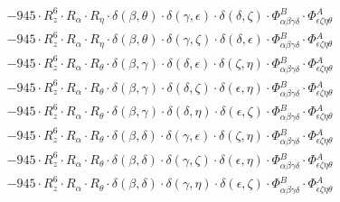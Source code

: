 \documentclass{article}
\begin{document}
\begin{equation}
\begin{array}{c}
 \\[0.2em] 		 - 945 \cdot R_{z}^{6} \cdot R_{\alpha{}} \cdot R_{\eta{}} \cdot \delta{}\left(\beta{}, \theta{}\right) \cdot \delta{}\left(\gamma{}, \epsilon{}\right) \cdot \delta{}\left(\delta{}, \zeta{}\right) \cdot \Phi{}^{B}_{\alpha{}\beta{}\gamma{}\delta{}} \cdot \Phi{}^{A}_{\epsilon{}\zeta{}\eta{}\theta{}} 
 \\[0.2em] 		 - 945 \cdot R_{z}^{6} \cdot R_{\alpha{}} \cdot R_{\eta{}} \cdot \delta{}\left(\beta{}, \theta{}\right) \cdot \delta{}\left(\gamma{}, \zeta{}\right) \cdot \delta{}\left(\delta{}, \epsilon{}\right) \cdot \Phi{}^{B}_{\alpha{}\beta{}\gamma{}\delta{}} \cdot \Phi{}^{A}_{\epsilon{}\zeta{}\eta{}\theta{}} 
 \\[0.2em] 		 - 945 \cdot R_{z}^{6} \cdot R_{\alpha{}} \cdot R_{\theta{}} \cdot \delta{}\left(\beta{}, \gamma{}\right) \cdot \delta{}\left(\delta{}, \epsilon{}\right) \cdot \delta{}\left(\zeta{}, \eta{}\right) \cdot \Phi{}^{B}_{\alpha{}\beta{}\gamma{}\delta{}} \cdot \Phi{}^{A}_{\epsilon{}\zeta{}\eta{}\theta{}} 
 \\[0.2em] 		 - 945 \cdot R_{z}^{6} \cdot R_{\alpha{}} \cdot R_{\theta{}} \cdot \delta{}\left(\beta{}, \gamma{}\right) \cdot \delta{}\left(\delta{}, \zeta{}\right) \cdot \delta{}\left(\epsilon{}, \eta{}\right) \cdot \Phi{}^{B}_{\alpha{}\beta{}\gamma{}\delta{}} \cdot \Phi{}^{A}_{\epsilon{}\zeta{}\eta{}\theta{}} 
 \\[0.2em] 		 - 945 \cdot R_{z}^{6} \cdot R_{\alpha{}} \cdot R_{\theta{}} \cdot \delta{}\left(\beta{}, \gamma{}\right) \cdot \delta{}\left(\delta{}, \eta{}\right) \cdot \delta{}\left(\epsilon{}, \zeta{}\right) \cdot \Phi{}^{B}_{\alpha{}\beta{}\gamma{}\delta{}} \cdot \Phi{}^{A}_{\epsilon{}\zeta{}\eta{}\theta{}} 
 \\[0.2em] 		 - 945 \cdot R_{z}^{6} \cdot R_{\alpha{}} \cdot R_{\theta{}} \cdot \delta{}\left(\beta{}, \delta{}\right) \cdot \delta{}\left(\gamma{}, \epsilon{}\right) \cdot \delta{}\left(\zeta{}, \eta{}\right) \cdot \Phi{}^{B}_{\alpha{}\beta{}\gamma{}\delta{}} \cdot \Phi{}^{A}_{\epsilon{}\zeta{}\eta{}\theta{}} 
 \\[0.2em] 		 - 945 \cdot R_{z}^{6} \cdot R_{\alpha{}} \cdot R_{\theta{}} \cdot \delta{}\left(\beta{}, \delta{}\right) \cdot \delta{}\left(\gamma{}, \zeta{}\right) \cdot \delta{}\left(\epsilon{}, \eta{}\right) \cdot \Phi{}^{B}_{\alpha{}\beta{}\gamma{}\delta{}} \cdot \Phi{}^{A}_{\epsilon{}\zeta{}\eta{}\theta{}} 
 \\[0.2em] 		 - 945 \cdot R_{z}^{6} \cdot R_{\alpha{}} \cdot R_{\theta{}} \cdot \delta{}\left(\beta{}, \delta{}\right) \cdot \delta{}\left(\gamma{}, \eta{}\right) \cdot \delta{}\left(\epsilon{}, \zeta{}\right) \cdot \Phi{}^{B}_{\alpha{}\beta{}\gamma{}\delta{}} \cdot \Phi{}^{A}_{\epsilon{}\zeta{}\eta{}\theta{}} 

\end{array}
\end{equation}
\end{document}
